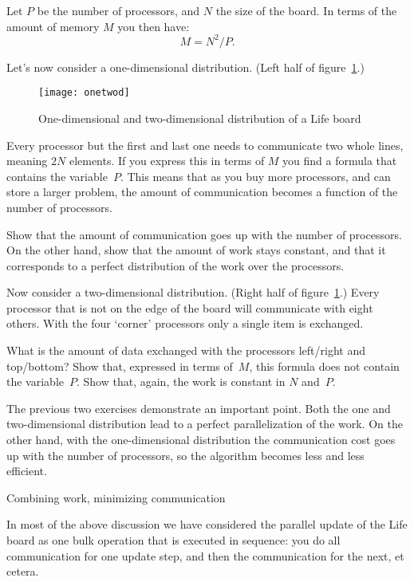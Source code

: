 Let $P$ be the number of processors, and $N$ the size of the
board. In terms of the amount of memory $M$ you then have:
\[ M=N^2/P. \]

Let's now consider a one-dimensional distribution. (Left half of figure~\ref{fig:onetwod}.)
\begin{figure}[ht]
  \texttt{[image: onetwod]}
  \caption{One-dimensional and two-dimensional distribution of a Life board}
  \label{fig:onetwod}
\end{figure}
Every processor but
the first and last one needs to communicate two whole lines, meaning
$2N$ elements. If you express this in terms of $M$ you find a formula
that contains the variable~$P$. This means that as you buy more
processors, and can store a larger problem, the amount of
communication becomes a function of the number of processors.

\begin{exercise}
  Show that the amount of communication goes up with the number of
  processors. On the other hand, show that the amount of work stays
  constant, and that it corresponds to a perfect distribution of the
  work over the processors.
\end{exercise}

Now consider a two-dimensional distribution. (Right half of
figure~\ref{fig:onetwod}.)  Every processor that is not on the edge of
the board will communicate with eight others. With the four `corner'
processors only a single item is exchanged.

\begin{exercise}
  What is the amount of data exchanged with the processors left/right
  and top/bottom? Show that, expressed in terms of~$M$, this formula
  does not contain the variable~$P$. Show that, again, the work is
  constant in $N$ and~$P$.
\end{exercise}

The previous two exercises demonstrate an important point. Both the
one and two-dimensional distribution lead to a perfect parallelization
of the work. On the other hand, with the one-dimensional distribution
the communication cost goes up with the number of processors, so the
algorithm becomes less and less efficient.

 {Combining work, minimizing communication}

In most of the above discussion we have considered the parallel update
of the Life board as one bulk operation that is executed in sequence:
you do all communication for one update step, and then the communication
for the next, et cetera.

